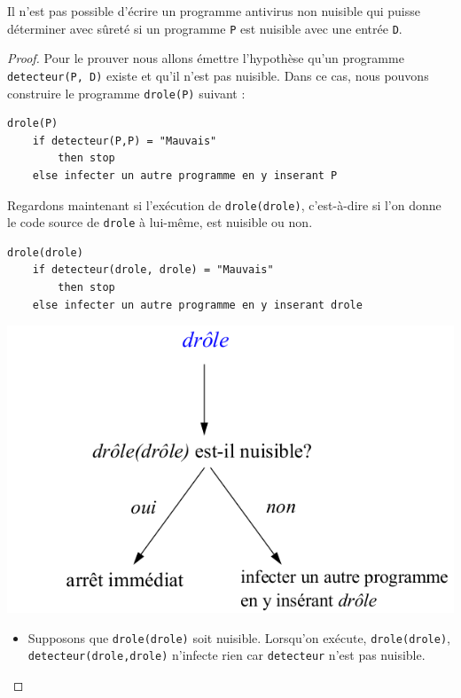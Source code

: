 \begin{mytheo}
	Il n'est pas possible d'écrire un programme antivirus non nuisible
	qui puisse déterminer avec sûreté
	si un programme \lstinline|P| est nuisible avec une entrée \lstinline|D|.
\end{mytheo}
\begin{proof}
	Pour le prouver nous allons émettre l'hypothèse qu'un programme \lstinline|detecteur(P, D)| existe et qu'il n'est pas nuisible. Dans ce cas, nous pouvons construire le programme \lstinline|drole(P)| suivant :

	\label{lst:detecteur_de_virus}
	\begin{lstlisting}
drole(P)
    if detecteur(P,P) = "Mauvais"
        then stop
    else infecter un autre programme en y inserant P
\end{lstlisting}

	Regardons maintenant si l'exécution de \lstinline|drole(drole)|, c'est-à-dire si l'on donne le code source de \lstinline|drole| à lui-même, est nuisible ou non.
	\begin{lstlisting}
drole(drole)
    if detecteur(drole, drole) = "Mauvais"
	    then stop
    else infecter un autre programme en y inserant drole
\end{lstlisting}

	\begin{center}
		\includegraphics[scale=0.5]{Images/drole_de_drole.png}
	\end{center}

	\begin{itemize}
		\item Supposons que \lstinline|drole(drole)| soit nuisible.
		      Lorsqu'on exécute, \lstinline|drole(drole)|,
		      \lstinline|detecteur(drole,drole)| n'infecte rien car \lstinline|detecteur| n'est pas nuisible.


\end{itemize}
\end{proof}
